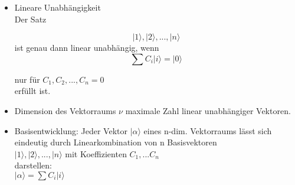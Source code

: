 \documentclass[10pt,article,colorback,accentcolor=tud9d]{scrartcl}
\begin{document}
\begin{itemize}
\item Lineare Unabhängigkeit\\
Der Satz
 
\begin{equation} \nonumber
{\left|1\rangle \right.,\left|2\rangle \right.,...,\left|n\rangle \right.}
\end{equation}
ist genau dann linear unabhängig, wenn
\begin{equation}
\sum {C}_i \left|i\rangle \right. = \left|0\rangle \right.
\end{equation}
 
nur für ${C}_1, {C}_2,...,{C}_n=0$\\
erfüllt ist.
\item Dimension des Vektorraums $\nu$ maximale Zahl linear unabhängiger 
Vektoren. 
\item Basisentwicklung: Jeder Vektor $\left|\alpha\rangle \right.$ eines n-dim. 
Vektorraums lässt sich eindeutig durch Linearkombination von n Basisvektoren \\
${\left|1\rangle \right.,\left|2\rangle \right.,...,\left|n\rangle \right.}$ mit Koeffizienten ${C}
_1,...{C}_n$\\
darstellen:\\
$\left|\alpha\rangle \right. = \sum {C}_i \left|i\rangle \right.$
\end{itemize}
\end{document}
